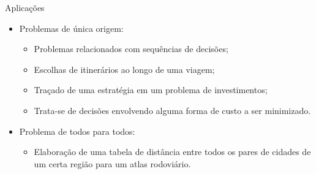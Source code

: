 \documentclass{beamer}
\begin{document}
\begin{frame}{Aplicações}
	\begin{itemize}
		\item Problemas de única origem:
		\begin{itemize}
			\item Problemas relacionados com sequências de decisões;
			\item Escolhas de itinerários ao longo de uma viagem;
			\item Traçado de uma estratégia em um problema de investimentos;
			\item Trata-se de decisões envolvendo alguma forma de custo a ser minimizado.
		\end{itemize}
		
		\bigskip
		
		\item Problema de todos para todos:
		\begin{itemize}
			\item Elaboração de uma tabela de distância entre todos os pares de cidades de um certa região para um atlas rodoviário.
		\end{itemize}
	\end{itemize}
\end{frame}
\end{document}
